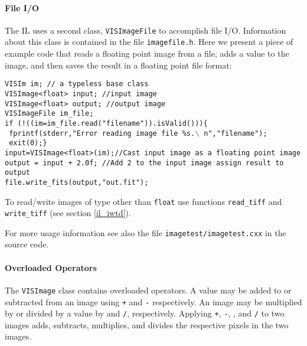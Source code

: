 \paragraph{File I/O}
The IL uses a second class, {\tt VISImageFile} to accomplish file I/O.
Information about this class is contained in the file {\tt imagefile.h}.
Here we present a piece of example code that reads a floating point
image from a file, adds a value to the image, and then saves the result
in a floating point file format:
\begin{list}{}{\setlength{\partopsep}{-1in}
\setlength{\topsep}{0in} \setlength{\labelwidth}{1in}
\setlength{\leftmargin}{0.5in} \setlength{\labelsep}{0.2in}} 
\item
{\tt VISIm im; // a typeless base class}\\
{\tt VISImage<float> input; //input image}\\
{\tt VISImage<float> output; //output image}\\
{\tt VISImageFile im\_file;}\\
{\tt if (!((im=im\_file.read("filename")).isValid()))\{}\\
{\tt \hspace*{0.25in} fprintf(stderr,"Error reading image file \%s.$\backslash$ n","filename");}\\
{\tt \hspace*{0.25in} exit(0);\}}\\
{\tt input=VISImage<float>(im);//Cast input image as a floating point image}\\
{\tt output = input + 2.0f; //Add 2 to the input image assign result to output}\\
{\tt file.write\_fits(output,"out.fit");}
\end{list}
To read/write images of type other than {\tt float}
use functions {\tt read\_tiff} and {\tt write\_tiff}
(see section \ref{il_iwtd}).

For more usage information see also the file {\tt imagetest/imagetest.cxx} in
the source code.

\paragraph{Overloaded Operators}
The {\tt VISImage} class contains overloaded operators.
A value may be added to or subtracted from an image using {\tt +} and
{\tt -} respectively.  An image may be multiplied by or divided by
a value by {\tt *} and {\tt /}, respectively.  Applying {\tt +}, {\tt -},
{\tt *}, and {\tt /} to two images adds, subtracts, multiplies, and
divides the respective pixels in the two images.

